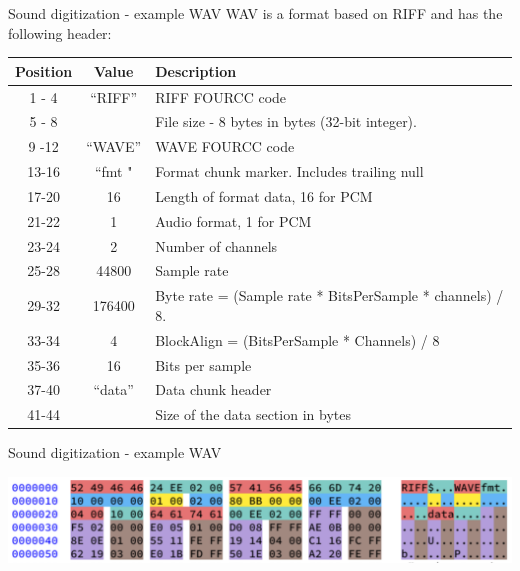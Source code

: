 \begin{frame}{Sound digitization - example WAV}
  WAV is a format based on RIFF and has the following header:
  \begin{center}
  \fontsize{8}{9}\selectfont
  \begin{tabularx}{13cm}{c|c|X}
    Position & Value & Description \\
    \hline
    1 - 4 & “RIFF” & RIFF FOURCC code \\
    5 - 8 &  & File size - 8 bytes in bytes (32-bit integer). \\
    9 -12 & “WAVE” & WAVE FOURCC code \\
    13-16 & “fmt " & Format chunk marker. Includes trailing null \\
    17-20 & 16 & Length of format data, 16 for PCM \\
    21-22 & 1 & Audio format, 1 for PCM \\
    23-24 & 2 & Number of channels \\
    25-28 & 44800 & Sample rate \\
    29-32 & 176400 & Byte rate = (Sample rate * BitsPerSample * channels) / 8. \\
    33-34 & 4 & BlockAlign = (BitsPerSample * Channels) / 8 \\
    35-36 & 16 & Bits per sample \\
    37-40 & “data” & Data chunk header \\
    41-44 &  & Size of the data section in bytes \\
  \end{tabularx}
  \end{center}
\end{frame}

\begin{frame}{Sound digitization - example WAV}
  \begin{center}
  \includegraphics[width=\textwidth]{slides/audio-sound/RIFF_WAVE.png}
  \end{center}
\end{frame}


